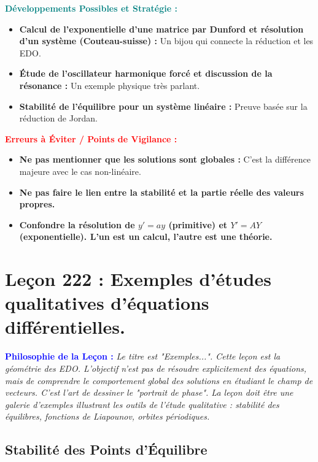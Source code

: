 \documentclass[12pt, a4paper, parskip=full]{report}
\theoremstyle{agregstyle}
\newenvironment{philosophie}
  {\par\medskip\noindent\begin{oframed}\noindent\textbf{\textcolor{blue}{Philosophie de la Leçon :}}\itshape}
  {\end{oframed}\par\medskip}
\newenvironment{developpements}
  {\par\medskip\noindent\begin{oframed}\noindent\textbf{\textcolor{teal}{Développements Possibles et Stratégie :}}}
  {\end{oframed}\par\medskip}
\newenvironment{erreurs}
  {\par\medskip\noindent\begin{oframed}\noindent\textbf{\textcolor{red}{Erreurs à Éviter / Points de Vigilance :}}}
  {\end{oframed}\par\medskip}
\begin{document}
\begin{developpements}
    \begin{itemize}
        \item \textbf{Calcul de l'exponentielle d'une matrice par Dunford et résolution d'un système (Couteau-suisse) :} Un bijou qui connecte la réduction et les EDO.
        \item \textbf{Étude de l'oscillateur harmonique forcé et discussion de la résonance :} Un exemple physique très parlant.
        \item \textbf{Stabilité de l'équilibre pour un système linéaire :} Preuve basée sur la réduction de Jordan.
    \end{itemize}
\end{developpements}

\begin{erreurs}
    \begin{itemize}
        \item \textbf{Ne pas mentionner que les solutions sont globales :} C'est la différence majeure avec le cas non-linéaire.
        \item \textbf{Ne pas faire le lien entre la stabilité et la partie réelle des valeurs propres.}
        \item \textbf{Confondre la résolution de $y'=ay$ (primitive) et $Y'=AY$ (exponentielle). L'un est un calcul, l'autre est une théorie.}
    \end{itemize}
\end{erreurs}
\chapter{Leçon 222 : Exemples d'études qualitatives d'équations différentielles.}

\begin{philosophie}
    Le titre est "Exemples...". Cette leçon est la géométrie des EDO. L'objectif n'est pas de résoudre explicitement des équations, mais de comprendre le comportement global des solutions en étudiant le champ de vecteurs. C'est l'art de dessiner le "portrait de phase". La leçon doit être une galerie d'exemples illustrant les outils de l'étude qualitative : stabilité des équilibres, fonctions de Liapounov, orbites périodiques.
\end{philosophie}

\section{Stabilité des Points d'Équilibre}
\end{document}
